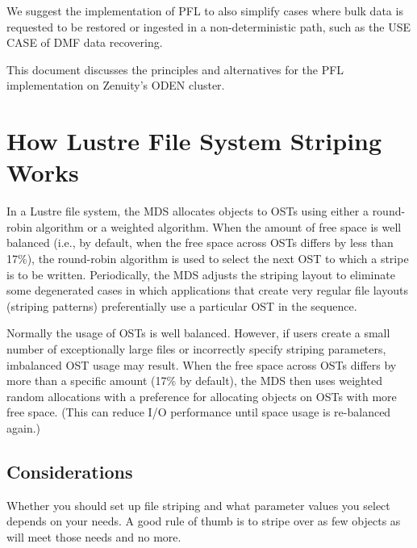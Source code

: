 \documentclass{article}
\begin{document}
We suggest the implementation of PFL to also simplify cases where bulk data is requested to be restored or ingested in a non-deterministic path, such as the USE CASE of DMF data recovering.

This document discusses the principles and alternatives for the PFL implementation on Zenuity's ODEN cluster.


\section{How Lustre File System Striping Works}
In a Lustre file system, the MDS allocates objects to OSTs using either a round-robin algorithm or a weighted algorithm. When the amount of free space is well balanced (i.e., by default, when the free space across OSTs differs by less than 17\%), the round-robin algorithm is used to select the next OST to which a stripe is to be written. Periodically, the MDS adjusts the striping layout to eliminate some degenerated cases in which applications that create very regular file layouts (striping patterns) preferentially use a particular OST in the sequence.

Normally the usage of OSTs is well balanced. However, if users create a small number of exceptionally large files or incorrectly specify striping parameters, imbalanced OST usage may result. When the free space across OSTs differs by more than a specific amount (17\% by default), the MDS then uses weighted random allocations with a preference for allocating objects on OSTs with more free space. (This can reduce I/O performance until space usage is re-balanced again.) 
\subsection{Considerations}
Whether you should set up file striping and what parameter values you select depends on your needs. A good rule of thumb is to stripe over as few objects as will meet those needs and no more.
\end{document}
